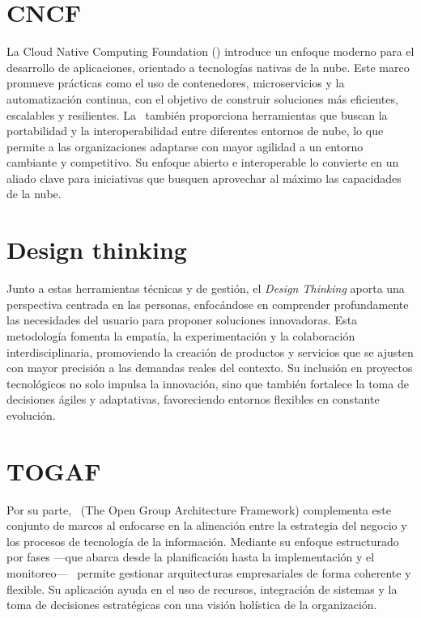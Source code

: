 \section{CNCF}
\noindent
La Cloud Native Computing Foundation (\CNCF) introduce un enfoque moderno para el desarrollo de aplicaciones, orientado a tecnologías nativas de la nube. Este marco promueve prácticas como el uso de contenedores, microservicios y la automatización continua, con el objetivo de construir soluciones más eficientes, escalables y resilientes\citep{CNCF2023}. La \CNCF\ también proporciona herramientas que buscan la portabilidad y la interoperabilidad entre diferentes entornos de nube, lo que permite a las organizaciones adaptarse con mayor agilidad a un entorno cambiante y competitivo. Su enfoque abierto e interoperable lo convierte en un aliado clave para iniciativas que busquen aprovechar al máximo las capacidades de la nube.

\section{Design thinking}
\noindent
Junto a estas herramientas técnicas y de gestión, el \textit{Design Thinking} aporta una perspectiva centrada en las personas, enfocándose en comprender profundamente las necesidades del usuario para proponer soluciones innovadoras\citep{CombellesC.LucenaP.2020}. Esta metodología fomenta la empatía, la experimentación y la colaboración interdisciplinaria, promoviendo la creación de productos y servicios que se ajusten con mayor precisión a las demandas reales del contexto. Su inclusión en proyectos tecnológicos no solo impulsa la innovación, sino que también fortalece la toma de decisiones ágiles y adaptativas, favoreciendo entornos flexibles en constante evolución\citep{brown2008}.

\section{TOGAF}
\noindent
Por su parte, \TOGAF\ (The Open Group Architecture Framework) complementa este conjunto de marcos al enfocarse en la alineación entre la estrategia del negocio y los procesos de tecnología de la información. Mediante su enfoque estructurado por fases —que abarca desde la planificación hasta la implementación y el monitoreo— \TOGAF\ permite gestionar arquitecturas empresariales de forma coherente y flexible. Su aplicación ayuda en el uso de recursos, integración de sistemas y la toma de decisiones estratégicas con una visión holística de la organización\citep{Mumtaza2025}.

